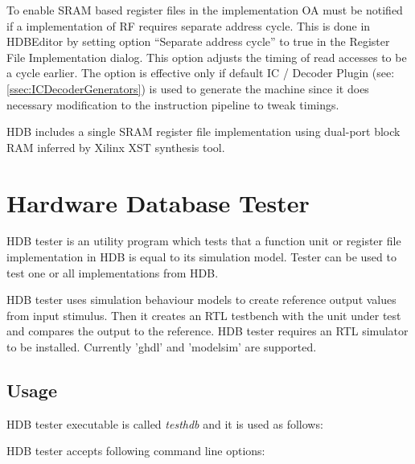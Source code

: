 \documentclass[a4paper,twoside]{tceusermanual}
\begin{document}
To enable SRAM based register files in the implementation OA must be
notified if a implementation of RF requires separate address
cycle. This is done in HDBEditor by setting option ``Separate address
cycle'' to true in the Register File Implementation dialog. This
option adjusts the timing of read accesses to be a cycle earlier. The
option is effective only if default IC / Decoder Plugin (see:
\ref{ssec:ICDecoderGenerators}) is used to generate the machine since
it does necessary modification to the instruction pipeline to tweak
timings.

HDB includes a single SRAM register file implementation using
dual-port block RAM inferred by Xilinx XST synthesis tool.

\section{Hardware Database Tester}
\label{sec:hdbtester}

HDB tester is an utility program which tests that a function unit or register
file implementation in HDB is equal to its simulation model. Tester can be used
to test one or all implementations from HDB.

HDB tester uses simulation behaviour models to create reference output values
from input stimulus. Then it creates an RTL testbench with the unit under test
and compares the output to the reference. HDB tester requires an RTL simulator
to be installed. Currently 'ghdl' and 'modelsim' are supported.

\subsection{Usage}

HDB tester executable is called \textit{testhdb} and it is used as follows:


HDB tester accepts following command line options:
\end{document}
